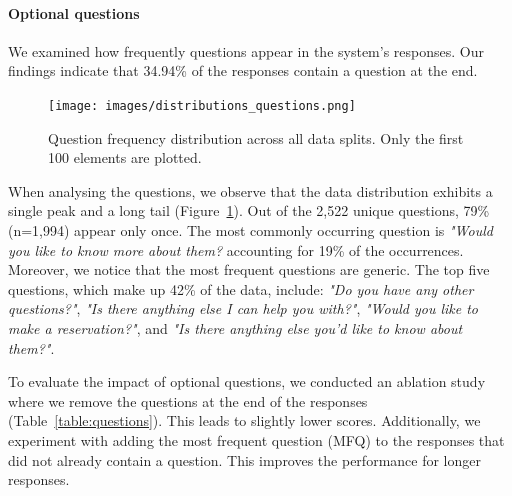 \documentclass[11pt]{article}
\begin{document}
\paragraph{Optional questions}\label{sec:questions}We examined how frequently questions appear in the system's responses. Our findings indicate that 34.94\% of the responses contain a question at the end.

\begin{figure}[!h]
    \centering
    \texttt{[image: images/distributions\_questions.png]}
    \caption{Question frequency distribution across all data splits. Only the first 100 elements are plotted.}
    \label{fig:distribution_questions}
\end{figure}

When analysing the questions, we observe that the data distribution exhibits a single peak and a long tail (Figure~\ref{fig:distribution_questions}). Out of the 2,522 unique questions, 79\% (n=1,994) appear only once. The most commonly occurring question is \textit{"Would you like to know more about them?}  accounting for 19\% of the occurrences. Moreover, we notice that the most frequent questions are generic. The top five questions, which make up 42\% of the data, include: \textit{"Do you have any other questions?"}, \textit{"Is there anything else I can help you with?"}, \textit{"Would you like to make a reservation?"}, and \textit{"Is there anything else you'd like to know about them?"}.

To evaluate the impact of optional questions, we conducted an ablation study where we remove the questions at the end of the responses (Table~\ref{table:questions}). This leads to slightly lower scores. Additionally, we experiment with adding the most frequent question (MFQ) to the responses that did not already contain a question. This improves the performance for longer responses.

\begin{table}[!h]
    \centering
    \caption{Results of investigation regarding questions on the validation set.}
    \label{table:questions}
\end{table}
\end{document}
